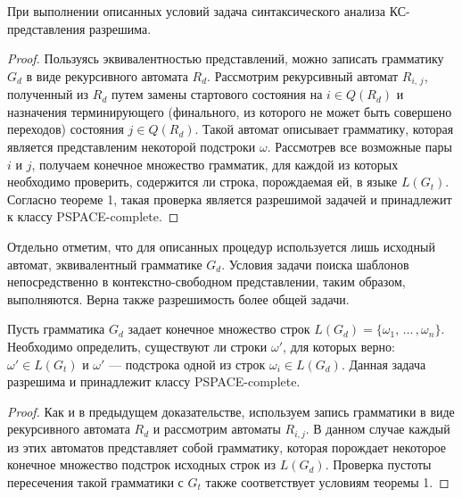 
\begin{prop}
	При выполнении описанных условий задача синтаксического анализа КС-представления разрешима.
\end{prop}

\begin{proof}
Пользуясь эквивалентностью представлений, можно записать грамматику $G_d$ в виде рекурсивного автомата $R_d$. Рассмотрим рекурсивный автомат $R_{i,\,j}$, полученный из $R_d$ путем замены стартового состояния на $i \in Q(R_d)$ и назначения терминирующего (финального, из которого не может быть совершено переходов) состояния $j \in Q(R_d)$. Такой автомат описывает грамматику, которая является представленим некоторой подстроки $\omega$. 
Рассмотрев все возможные пары $i$ и $j$, получаем конечное множество грамматик, для каждой из которых необходимо проверить, содержится ли строка, порождаемая ей, в языке $L(G_t)$. 
Согласно теореме 1, такая проверка является разрешимой задачей и принадлежит к классу PSPACE-complete.
\end{proof}

Отдельно отметим, что для описанных процедур используется лишь исходный автомат, эквивалентный грамматике $G_d$. 
Условия задачи поиска шаблонов непосредственно в контекстно-свободном представлении, таким образом, выполняются. 
Верна также разрешимость более общей задачи.

\begin{prop}
	Пусть грамматика $G_d$ задает конечное множество строк $L(G_d) = \{\omega_1, \, \dots \, , \omega_n \}$. Необходимо определить, существуют ли строки $\omega'$, для которых верно: $\omega' \in L(G_t)$ и $\omega'$ --- подстрока одной из строк $\omega_i \in L(G_d)$. Данная задача разрешима и принадлежит классу PSPACE-complete.
\end{prop}

\begin{proof}
	Как и в предыдущем доказательстве, используем запись грамматики в виде рекурсивного автомата $R_d$ и рассмотрим автоматы $R_{i, j}$. В данном случае каждый из этих автоматов представляет собой грамматику, которая порождает некоторое конечное множество подстрок исходных строк из $L(G_d)$. Проверка пустоты пересечения такой грамматики с $G_t$ также соответствует условиям теоремы 1.
\end{proof}

